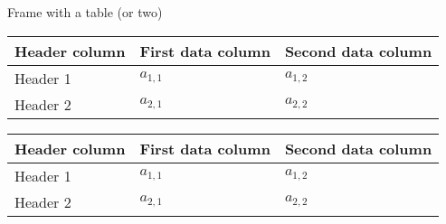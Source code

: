 \documentclass[tikz]{beamer}
\begin{document}
\begin{frame}{Frame with a table (or two)}
\begin{center}
\begin{tabular}{l | l l }
\toprule
Header column & First data column & Second data column \\
\midrule
Header 1 & \(a_{1,1}\) & \(a_{1,2}\) \\
Header 2 & \(a_{2,1}\) & \(a_{2,2}\) \\
\bottomrule
\end{tabular}
\end{center}
\begin{center}
\begin{tabular}{l | l l }
\toprule
Header column & First data column & Second data column \\
\midrule
Header 1 & \(a_{1,1}\) & \(a_{1,2}\) \\
Header 2 & \(a_{2,1}\) & \(a_{2,2}\) \\
\bottomrule
\end{tabular}
\end{center}
\end{frame}
\end{document}
